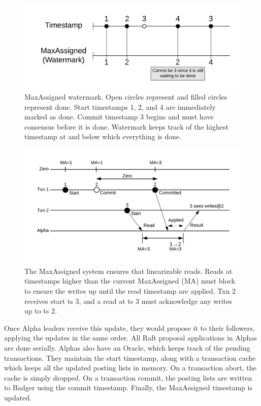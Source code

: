 \documentclass[letterpaper,twocolumn,10pt]{article}
\begin{document}
\begin{figure}[t]
\begin{center}
	\includegraphics[scale=0.65]{maxassigned.png}
\end{center}
\caption{MaxAssigned watermark. Open circles represent and filled circles represent done. Start timestamps 1, 2, and 4 are immediately marked as done. Commit timestamp 3 begins and must have consensus before it is done. Watermark keeps track of the highest timestamp at and below which everything is done.}
\end{figure}

\begin{figure}[t]
\begin{center}
	\includegraphics[scale=0.65]{maxassigned-derivation.png}
\end{center}
\caption{The MaxAssigned system ensures that linearizable reads. Reads at timestamps higher than the current MaxAssigned (MA) must block to ensure the writes up until the read timestamp are applied. Txn 2 receives start ts 3, and a read at ts 3 must acknowledge any writes up to ts 2.}
\end{figure}

Once Alpha leaders receive this update, they would propose it to their
followers, applying the updates in the same order. All Raft proposal
applications in Alphas are done serially. Alphas also have an Oracle, which
keeps track of the pending transactions. They maintain the start timestamp,
along with a transaction cache which keeps all the updated posting lists in
memory. On a transaction abort, the cache is simply dropped. On a transaction
commit, the posting lists are written to Badger using the commit timestamp.
Finally, the MaxAssigned timestamp is updated.
\end{document}
